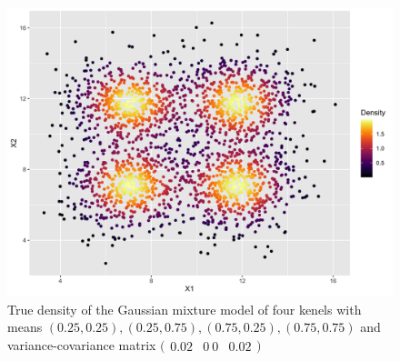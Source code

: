 \documentclass[11pt,a4paper,]{article}
\begin{document}
\begin{figure}

{\centering \includegraphics[width=0.8\linewidth]{figures/truedensity_4kernels} 

}

\caption{True density of the Gaussian mixture model of four kenels with means $(0.25, 0.25), (0.25, 0.75), (0.75, 0.25), (0.75, 0.75)$ and variance-covariance matrix $\big(\begin{smallmatrix} 0.02&0\ 0&0.02 \end{smallmatrix}\big)$}\label{fig:metadensity}
\end{figure}
\end{document}
